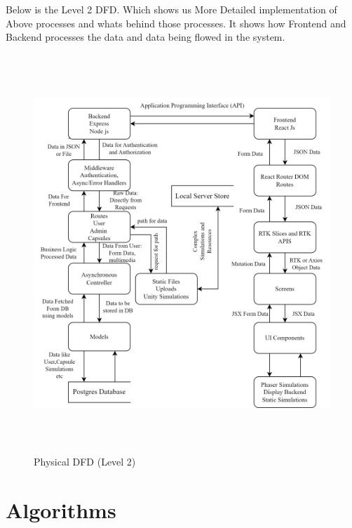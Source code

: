 Below is the Level 2 DFD. Which shows us More Detailed implementation of Above processes and whats behind those processes. It shows how Frontend and Backend processes the data and data being flowed in the system.
\begin{figure}[H]
    \centering
    \includegraphics[height = 15cm]{Diagrams/DFD Process Modeling (1).png}
    \caption{Physical DFD (Level 2)}
\end{figure}
\newpage
\section{Algorithms}
